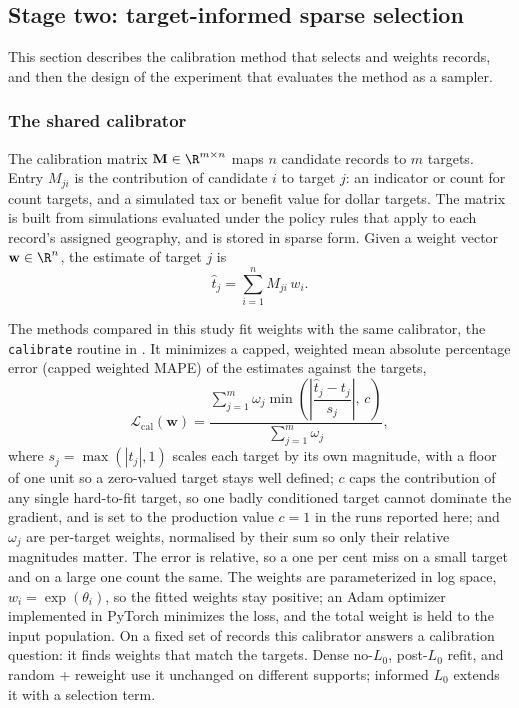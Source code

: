 \subsection{Stage two: target-informed sparse selection}
\label{sp:sec:methodology}

This section describes the calibration method that selects and weights records, and then the design
of the experiment that evaluates the method as a sampler.

\subsubsection{The shared calibrator}

The calibration matrix $\mathbf{M} \in \R^{m \times n}$ maps $n$ candidate records to $m$ targets.
Entry $M_{ji}$ is the contribution of candidate $i$ to target $j$: an indicator or count for count
targets, and a simulated tax or benefit value for dollar targets. The matrix is built from
\policyengine{} simulations evaluated under the policy rules that apply to each record's assigned
geography, and is stored in sparse form. Given a weight vector $\mathbf{w} \in \R^n$, the estimate of
target $j$ is
\begin{equation}
    \hat{t}_j = \sum_{i=1}^{n} M_{ji}\, w_i.
    \label{sp:eq:estimate}
\end{equation}

The methods compared in this study fit weights with the same calibrator, the \texttt{calibrate}
routine in \populace{}. It minimizes a capped, weighted mean absolute percentage error (capped weighted
MAPE) of the estimates against the targets,
\begin{equation}
    \mathcal{L}_{\mathrm{cal}}(\mathbf{w}) =
    \frac{\sum_{j=1}^{m} \omega_j \min\!\left(\left|\dfrac{\hat{t}_j - t_j}{s_j}\right|,\, c\right)}
         {\sum_{j=1}^{m} \omega_j},
    \label{sp:eq:loss_cal}
\end{equation}
where $s_j = \max(|t_j|, 1)$ scales each target by its own magnitude, with a floor of one unit so a
zero-valued target stays well defined; $c$ caps the contribution of any single hard-to-fit target, so
one badly conditioned target cannot dominate the gradient, and is set to the production value $c = 1$ in
the runs reported here; and $\omega_j$ are
per-target weights, normalised by their sum so only their relative magnitudes matter. The error is
relative, so a one per cent miss on a small target and on a large one count the same. The weights are
parameterized in log space, $w_i = \exp(\theta_i)$, so the fitted weights stay positive; an Adam
optimizer \citep{kingma2015} implemented in PyTorch \citep{pytorch2019} minimizes the loss, and the
total weight is held to the input population. On a fixed set of records this calibrator answers a
calibration question: it finds weights that match the targets. Dense no-$L_0$, post-$L_0$ refit, and
random + reweight use it unchanged on different supports; informed $L_0$ extends it with a selection
term.

